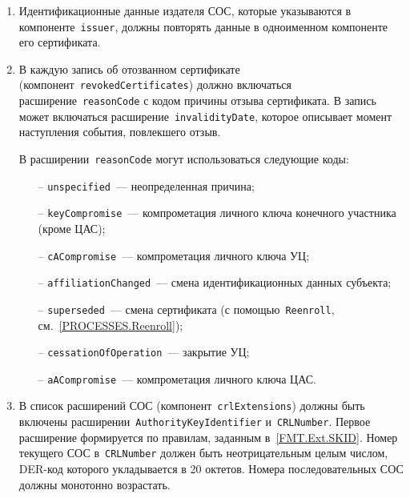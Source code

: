 \begin{enumerate}
\item
Идентификационные данные издателя СОС, которые указываются в 
компоненте~\texttt{issuer}, должны повторять данные в одноименном 
компоненте его сертификата. 

\item
В каждую запись об отозванном сертификате 
(компонент~\texttt{revokedCertificates}) должно включаться 
расширение~\texttt{reasonCode} с кодом причины отзыва сертификата. 
%
В запись может включаться расширение~\texttt{invalidityDate}, которое 
описывает момент наступления события, повлекшего отзыв.

В расширении~\texttt{reasonCode} могут использоваться следующие коды:
\begin{itemize}
\item[--]
\texttt{unspecified}~--- неопределенная причина;
\item[--]
\texttt{keyCompromise}~--- компрометация личного ключа конечного участника 
(кроме ЦАС); 
\item[--]
\texttt{cACompromise}~--- компрометация личного ключа УЦ;
\item[--]
\texttt{affiliationChanged}~--- смена идентификационных данных субъекта;
\item[--]
\texttt{superseded}~--- смена сертификата (с помощью~\texttt{Reenroll}, 
см.~\ref{PROCESSES.Reenroll}); 
\item[--]
\texttt{cessationOfOperation}~--- закрытие УЦ;
\item[--]
\texttt{aACompromise}~--- компрометация личного ключа ЦАС.
\end{itemize}

\item
В список расширений СОС (компонент~\texttt{crlExtensions})
должны быть включены расширении~\texttt{AuthorityKeyIdentifier} 
и~\texttt{CRLNumber}. Первое расширение формируется по правилам,
заданным в~\ref{FMT.Ext.SKID}. Номер текущего СОС в~\texttt{CRLNumber}
должен быть неотрицательным целым числом, DER-код которого укладывается в 
20 октетов. Номера последовательных СОС должны монотонно возрастать.
\end{enumerate}
